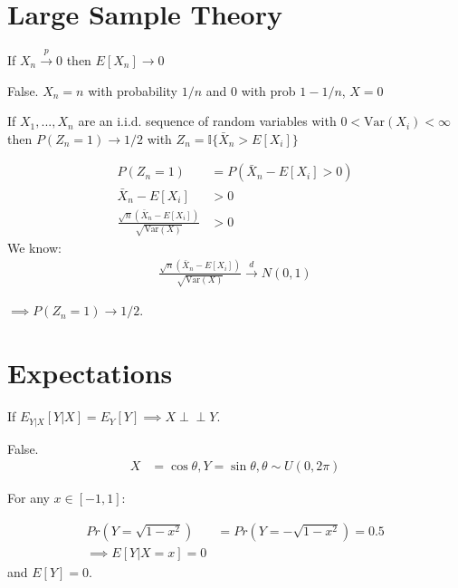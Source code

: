\documentclass{exam}
\newcommand{\indep}{\perp \!\!\! \perp}
\begin{document}
    


\section*{Large Sample Theory}
\begin{questions}
    
\question If $X_n \xrightarrow{p} 0$ then $E[X_n] \rightarrow 0$
\begin{solution}
False. $X_n = n$ with probability $1/n$ and 0 with prob $1 - 1/n$,  $X = 0$
\end{solution}



\question If $X_1,...,X_n$ are an i.i.d. sequence of random variables with $0 < \text{Var}(X_i) < \infty$ then 
$P(Z_n = 1) \rightarrow 1/2$ with $Z_n = \mathbb{I}\{\bar{X}_n > E[X_i]\}$


\begin{solution}
    \begin{align*}
    P(Z_n = 1) &= P(\bar{X}_n - E[X_i] > 0) \\
    \bar{X}_n - E[X_i] &> 0 \\
    \frac{
        \sqrt{n}(\bar{X}_n - E[X_i])
    }{
        \sqrt{\text{Var}(X)}
    } &> 0 
    \end{align*}
    We know:
    \begin{align*}
    \frac{
        \sqrt{n}(\bar{X}_n - E[X_i])
    }{
        \sqrt{\text{Var}(X)}
    } \xrightarrow{d} N(0, 1)
    \end{align*}

    $\implies P(Z_n = 1) \rightarrow 1/2$.

\end{solution}


\section*{Expectations}


    \question If $E_{Y | X}[Y | X ] = E_Y[Y] \implies X \indep Y$.

    False. 
    \begin{align*}
        X &= \cos \theta, Y = \sin \theta, \theta \sim U(0, 2\pi)
    \end{align*}

    For any $x \in [-1, 1]$:

    \begin{align*}
        Pr(Y = \sqrt{1 - x^2}) &= Pr(Y = - \sqrt{1 - x^2}) = 0.5 \\
        \implies E[Y | X = x] = 0
    \end{align*}
    and $E[Y] = 0$.


\end{questions}
\end{document}
